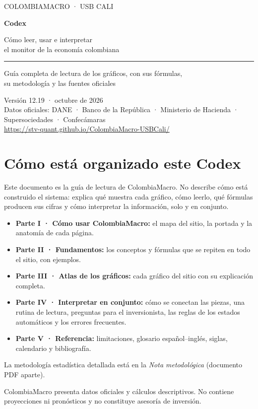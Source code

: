 \documentclass[11pt,a4paper,openany]{report}
\begin{document}
\begin{titlepage}
\centering\vspace*{3cm}
{\sffamily\color{cmblue}\large COLOMBIAMACRO · USB CALI\par}\vspace{1.2cm}
{\sffamily\bfseries\fontsize{40}{44}\selectfont Codex\par}\vspace{0.4cm}
{\sffamily\Large Cómo leer, usar e interpretar\\el monitor de la economía colombiana\par}\vspace{1.6cm}
{\color{cmmuted}\rule{0.5\linewidth}{0.4pt}\par}\vspace{0.8cm}
{\large Guía completa de lectura de los gráficos, con sus fórmulas,\\su metodología y las fuentes oficiales\par}
\vfill
{\sffamily\small\color{cmmuted} Versión 12.19 · octubre de 2026\\
Datos oficiales: DANE · Banco de la República · Ministerio de Hacienda · Supersociedades · Confecámaras\\
\url{https://stv-quant.github.io/ColombiaMacro-USBCali/}\par}
\end{titlepage}
\tableofcontents
\clearpage{}
\chapter*{Cómo está organizado este Codex}
Este documento es la guía de lectura de ColombiaMacro. No describe cómo está construido el sistema: explica qué muestra
cada gráfico, cómo leerlo, qué fórmulas producen sus cifras y cómo interpretar la información, solo y en conjunto.
\begin{itemize}
\item \textbf{Parte I · Cómo usar ColombiaMacro:} el mapa del sitio, la portada y la anatomía de cada página.
\item \textbf{Parte II · Fundamentos:} los conceptos y fórmulas que se repiten en todo el sitio, con ejemplos.
\item \textbf{Parte III · Atlas de los gráficos:} cada gráfico del sitio con su explicación completa.
\item \textbf{Parte IV · Interpretar en conjunto:} cómo se conectan las piezas, una rutina de lectura, preguntas para el
  inversionista, las reglas de los estados automáticos y los errores frecuentes.
\item \textbf{Parte V · Referencia:} limitaciones, glosario español--inglés, siglas, calendario y bibliografía.
\end{itemize}
La metodología estadística detallada está en la \emph{Nota metodológica} (documento PDF aparte).
\begin{alerta}[Aviso]
ColombiaMacro presenta datos oficiales y cálculos descriptivos. No contiene proyecciones ni pronósticos y no constituye
asesoría de inversión.
\end{alerta}





\end{document}
